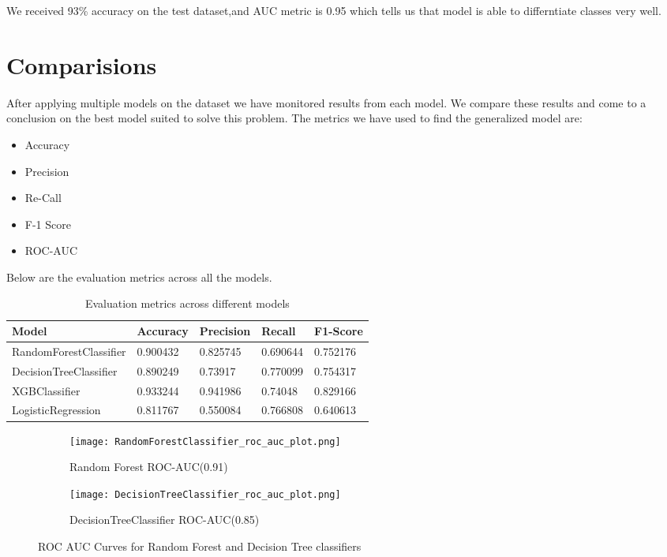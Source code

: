 \documentclass[12pt]{article}
\begin{document}
We received 93\% accuracy on the test dataset,and AUC metric is 0.95 which tells us that model is able to differntiate classes very well. 

\section{Comparisions}

After applying multiple models on the dataset we have monitored results from each model. We compare these results and come to a conclusion on the best model suited to solve this problem.
The metrics we have used to find the generalized model are:

\begin{itemize}
  \item Accuracy
  \item Precision
  \item Re-Call
  \item F-1 Score
  \item ROC-AUC 
 \end{itemize}
 
Below are the evaluation metrics across all the models.

\begin{table}[!ht]
    \centering
    \begin{tabular}{|l|l|l|l|l|}
    \hline
        Model & Accuracy & Precision & Recall & F1-Score \\ \hline
        RandomForestClassifier & 0.900432 & 0.825745 & 0.690644 & 0.752176 \\ \hline
        DecisionTreeClassifier & 0.890249 & 0.73917 & 0.770099 & 0.754317 \\ \hline
        XGBClassifier & 0.933244 & 0.941986 & 0.74048 & 0.829166 \\ \hline
        LogisticRegression & 0.811767 & 0.550084 & 0.766808 & 0.640613 \\ \hline
    \end{tabular}
    \caption{Evaluation metrics across different models}
\end{table}


\begin{figure}[!htb]
     \centering
     \begin{subfigure}[b]{0.3\textwidth}
         \centering
         \texttt{[image: RandomForestClassifier\_roc\_auc\_plot.png]}
         \caption{Random Forest ROC-AUC(0.91)}
         \label{fig:RF}
     \end{subfigure}
     \hfill
     \begin{subfigure}[b]{0.3\textwidth}
         \centering
         \texttt{[image: DecisionTreeClassifier\_roc\_auc\_plot.png]}
         \caption{DecisionTreeClassifier ROC-AUC(0.85)}
         \label{fig:DT}
     \end{subfigure}
     \hfill
        \caption{ROC AUC Curves for Random Forest and Decision Tree classifiers}
        \label{fig:ROC AUC}
\end{figure}
\end{document}
